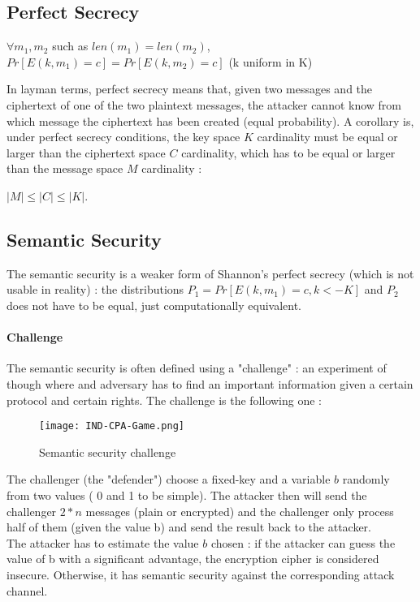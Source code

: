 \subsection{Perfect Secrecy}

\begin{mytheorem}
    $\forall m_1,m_2$ such as $len(m_1) = len(m_2)$, 
    $Pr[E(k,m_1) = c] = Pr[E(k,m_2) = c]$  \flushright (k uniform in K)
\end{mytheorem}

In layman terms, perfect secrecy means that, given two messages and the ciphertext of one of the two plaintext messages, the attacker cannot know from which message the ciphertext has been created (equal probability). A corollary is, under perfect secrecy conditions, the key space $K$ cardinality must be equal or larger than the ciphertext space $C$ cardinality, which has to be equal or larger than the message space $M$ cardinality :
\begin{mytheorem}
    $ |M| \leq |C| \leq |K| $. 
\end{mytheorem}


\subsection{Semantic Security}

The semantic security is a weaker form of Shannon's perfect secrecy (which is not usable in reality) : the distributions $P_1 = Pr[E(k,m_1) = c , k<- K]$ and $P_2$ does not have to be equal, just computationally equivalent.

\paragraph{Challenge}
The semantic security is often defined using a "challenge" : an experiment of though where and adversary has to find an important information given a certain protocol and certain rights. The challenge is the following one :

\begin{figure}[ht!]
	\centering
		\texttt{[image: IND-CPA-Game.png]}
	\caption{Semantic security challenge}
	\label{fig:SemanticSecurityChallenge}
\end{figure}

The challenger (the "defender") choose a fixed-key and a variable $b$ randomly from two values ( 0 and 1 to be simple). The attacker then will send the challenger $2*n$ messages (plain or encrypted) and the challenger only process half of them (given the value b) and send the result back to the attacker.\\
The attacker has to estimate the value $b$ chosen : if the attacker can guess the value of b with a significant advantage, the encryption cipher is considered insecure. Otherwise, it has semantic security against the corresponding attack channel.

